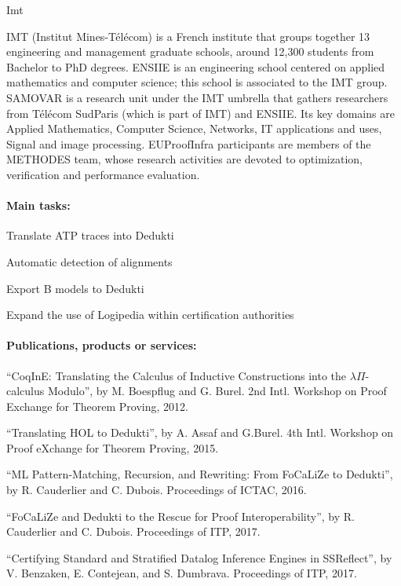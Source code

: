 \begin{sitedescription}{Imt}


IMT (Institut Mines-T\'el\'ecom) is a French institute that groups together 13 engineering and management graduate schools, around 12,300 students from Bachelor to PhD degrees.
ENSIIE is an engineering school centered on applied mathematics and computer science; this school is associated to the IMT group. SAMOVAR is a research unit under the IMT umbrella that gathers researchers from T\'el\'ecom SudParis (which is part of IMT) and ENSIIE. Its key domains are Applied Mathematics,  Computer Science, Networks, IT applications and uses, Signal and image processing. EUProofInfra participants are members of the METHODES team, whose research activities are devoted to
optimization, verification and performance evaluation.

\paragraph*{Main tasks:}

\begin{compactitem}
\item Translate ATP traces into Dedukti 
\item Automatic detection of alignments 
\item Export B models to Dedukti 
\item Expand the use of Logipedia within certification authorities  
\end{compactitem}

\paragraph*{Publications, products or services:}

\begin{compactitem}
 \item ``CoqInE: Translating the Calculus of Inductive Constructions
   into the $\lambda{}\Pi{}$-calculus Modulo'', by M. Boespflug and
   G. Burel. 2nd Intl. Workshop on Proof Exchange for Theorem Proving,
   2012.
 \item ``Translating HOL to Dedukti'', by A. Assaf and G.Burel. 4th Intl. Workshop on Proof eXchange for Theorem Proving, 2015.
 \item ``ML Pattern-Matching, Recursion, and Rewriting: From FoCaLiZe to Dedukti'', by R. Cauderlier and C. Dubois. Proceedings of ICTAC, 2016.
 \item ``FoCaLiZe and Dedukti to the Rescue for Proof Interoperability'', by R. Cauderlier and C. Dubois. Proceedings of ITP, 2017.
 \item ``Certifying Standard and Stratified Datalog Inference Engines in SSReflect'', by V. Benzaken, E. Contejean, and S. Dumbrava. Proceedings of ITP, 2017.
\end{compactitem}


\end{sitedescription}

